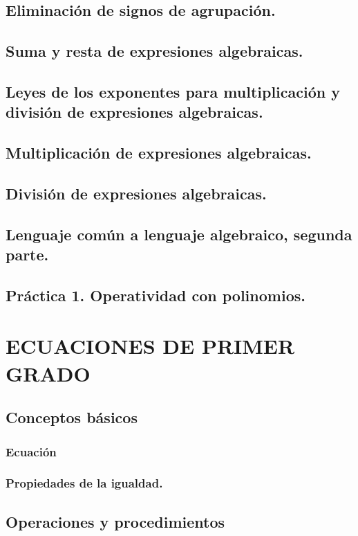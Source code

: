 \subsection{Eliminación de signos de agrupación.}
\subsection{Suma y resta de expresiones algebraicas.}
\subsection{Leyes de los exponentes para multiplicación y división de expresiones algebraicas.}
\subsection{Multiplicación de expresiones algebraicas.}
\subsection{División de expresiones algebraicas.}
\subsection{Lenguaje común a lenguaje algebraico, segunda parte.}
\subsection{Práctica 1. Operatividad con polinomios.}








\section{ECUACIONES DE PRIMER GRADO}%

\subsection{Conceptos básicos}
\subsubsection{Ecuación}
\subsubsection{Propiedades de la igualdad.}
\subsection{Operaciones y procedimientos }
